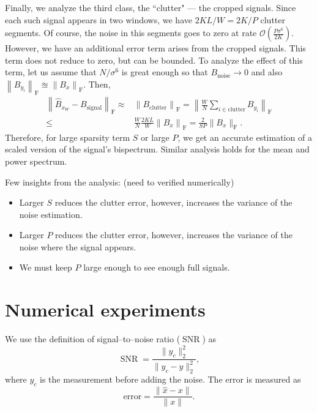 \documentclass[journal]{IEEEtran}
\numberwithin{equation}{section}
\numberwithin{figure}{section}
\theoremstyle{plain}
\theoremstyle{definition}
\theoremstyle{remark}
\theoremstyle{plain}
\theoremstyle{remark}
\theoremstyle{plain}
\theoremstyle{plain}
\newcommand{\order}[1]{\mathcal{O}\left({#1} \right)}
\newcommand{\SNR}{\operatorname{SNR}}
\begin{document}
Finally, we analyze the third class, the  ``clutter" --- the cropped signals. Since each such signal appears in two windows,
we have $2KL/W = 2K/P$ clutter segments. Of course, the noise in this segments goes to zero
at rate $\order{\frac{P\sigma^6}{2K}}$. However, we have an additional error term arises from  the cropped signals. This term does not reduce to zero, but can be bounded. 
 To analyze the effect of this term, let us assume that $N/\sigma^6$ is great enough so that $B_\textrm{noise}\to 0$ and also $\left\|B_{y_i}\right\|_{\textrm{F}} \approxeq \left\|B_x\right\|_{\textrm{F}}$. Then,
\begin{equation}
\begin{split}
\left\| \hat{B}_{x_W} - B_\textrm{signal}\right\|_{\textrm{F}} \approx&  \left\|B_\textrm{clutter}\right\|_{\textrm{F}}
= \left\|\frac{W}{N}\sum_{i\in\textrm{clutter}}B_{y_i}\right\|_{\textrm{F}}
\\ \leq & 
\frac{W}{N}\frac{2KL}{W}\left\|B_x\right\|_{\textrm{F}} = \frac{2}{SP}
\|B_x\|_{\textrm{F}}.
\end{split}
\end{equation}
Therefore, for large sparsity term $S$ or large $P$, we get an accurate estimation of a scaled version of the signal's bispectrum. Similar analysis holds for the mean and power spectrum.

Few insights from the analysis: (need to verified numerically)
\begin{itemize}
	\item Larger $S$ reduces the clutter error, however, increases the variance of the noise estimation.
	\item Larger $P$ reduces the clutter error, however, increases the variance of the noise  where the signal appears.
	\item We must keep $P$ large enough to see enough full signals.    
\end{itemize} 


\section{Numerical experiments} \label{sec:experiments}

We use the definition of signal--to--noise ratio ($\SNR$) as
\begin{equation}
\SNR = \frac{\|y_c\|_2^2}{\|y_c-y\|_2^2},
\end{equation}
where $y_c$ is the measurement before adding the noise. The error is measured as 
\begin{equation}
\textrm{error}  = \frac{\|\hat{x}-x\|}{\|x\|}.
\end{equation}
\end{document}
